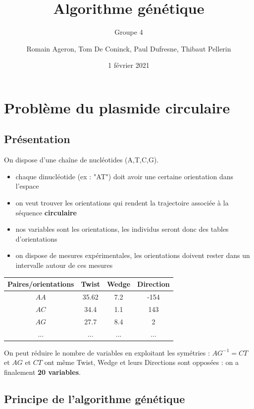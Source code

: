\documentclass[graphics]{beamer}
\title[Algorithme génétique]{Algorithme génétique}
\subtitle{Groupe 4}
\author[R. Ageron, T. De Coninck, P. Dufresne, T. Pellerin]{Romain Ageron, Tom De Coninck, Paul Dufresne, Thibaut Pellerin}
\date{1 février 2021}
\begin{document}
\begin{frame}
\titlepage
\end{frame}

\section{Problème du plasmide circulaire}
\subsection{Présentation}
\begin{frame}
	On dispose d'une chaîne de nucléotides (A,T,C,G).
	\begin{itemize}
		\item chaque dinucléotide (ex : "AT") doit avoir une certaine orientation dans l'espace 
		\item on veut trouver les orientations qui rendent la trajectoire associée à la séquence \textbf{circulaire}
		\item nos variables sont les orientations, les individus seront donc des tables d'orientations
		\item on dispose de mesures expérimentales, les orientations doivent rester dans un intervalle autour de ces mesures
	\end{itemize}
\end{frame}
\begin{frame}
	\begin{center}
		\begin{tabular}{ | c || c | c | c | }
			\hline
			Paires/orientations & Twist & Wedge & Direction \\ \hline
			$AA$ & 35.62 & 7.2 & -154 \\ \hline
			$AC$ & 34.4 & 1.1 & 143 \\ \hline
			$AG$ & 27.7 & 8.4 & 2 \\ \hline
			... & ... & ... & ... \\ \hline
		\end{tabular}
	\end{center}
	On peut réduire le nombre de variables en exploitant les symétries : $AG^{-1} = CT$ et $AG$ et $CT$ ont même Twist, Wedge et leurs Directions sont opposées : on a finalement \textbf{20 variables}.
\end{frame}

\subsection{Principe de l'algorithme génétique}
\end{document}
